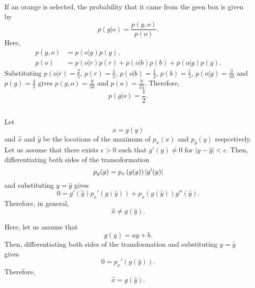 If an orange is selected, the probability that it came from the geen box is given by
%
\begin{equation}
p(g | o) = \frac{p(g, o)}{p(o)}.
\end{equation}
%
Here,
%
\begin{equation}
\begin{aligned}
p(g, o) &= p(o | g) p(g), \\
p(o) & = p(o | r) p(r) + p(o | b) p(b) + p(o | g) p(g).
\end{aligned}
\end{equation}
%
Substituting $p(o | r) = \frac{2}{5}$, $p(r) = \frac{1}{5}$, $p(o | b) = \frac{1}{2}$, $p(b) = \frac{1}{5}$, $p(o | g) = \frac{3}{10}$ and $p(g) = \frac{3}{5}$ gives $p(g, o) = \frac{9}{50}$ and $p(o) = \frac{9}{25}$.
%
Therefore,
\begin{equation}
p(g | o) = \frac{1}{2}.
\end{equation}


\subsection{}
Let 
%
\begin{equation}
x = g(y)
\end{equation}
%
and $\hat{x}$ and $\hat{y}$ be the locations of the maximum of $p_x(x)$ and $p_y(y)$ respcetively.
Let us assume that there exists $\epsilon > 0$ such that $g'(y) \neq 0$ for $\left| y - \hat{y} \right| < \epsilon$.
Then, differentiating both sides of the transoformation
%
\begin{equation}
p_y(y) = p_x \left( g(y) \right) \abs{g'(y)}
\end{equation}
%
and substituting $y = \hat{y}$ gives
%
\begin{equation}
0 = g'(\hat{y}) p_x' \left( g \left( \hat{y} \right) \right) + p_x \left( g \left( \hat{y} \right) \right) g'' \left( \hat{y} \right).
\end{equation}
%
Therefore, in general,
%
\begin{equation}
\hat{x} \neq g \left( \hat{y} \right).
\end{equation}
%

Here, let us assume that 
%
\begin{equation}
g(y) = a y + b.
\end{equation}
%
Then, differentiating both sides of the transformation and substituting $y = \hat{y}$ gives
%
\begin{equation}
0 = p_x' \left( g \left( \hat{y} \right) \right).
\end{equation}
%
Therefore, 
%
\begin{equation}
\hat{x} = g \left( \hat{y} \right).
\end{equation}
%


